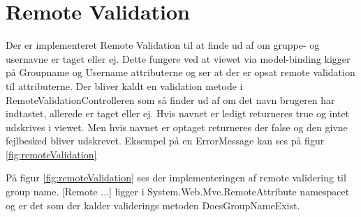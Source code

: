 \section{Remote Validation}
Der er implementeret Remote Validation til at finde ud af om gruppe- og usernavne er taget eller ej. Dette fungere ved at viewet via model-binding kigger på Groupname og Username attributerne og ser at der er opsat remote validation til attributerne. Der bliver kaldt en validation metode i RemoteValidationControlleren som så finder ud af om det navn brugeren har indtastet, allerede er taget eller ej. Hvis navnet er ledigt returneres true og intet udskrives i viewet. Men hvis navnet er optaget returneres der false og den givne fejlbesked bliver udskrevet. Eksempel på en ErrorMessage kan ses på figur \ref{fig:remoteValidation}


På figur \ref{fig:remoteValidation} ses der implementeringen af remote validering til group name. [Remote ...] ligger i System.Web.Mvc.RemoteAttribute namespacet og er det som der kalder validerings metoden DoesGroupNameExist.